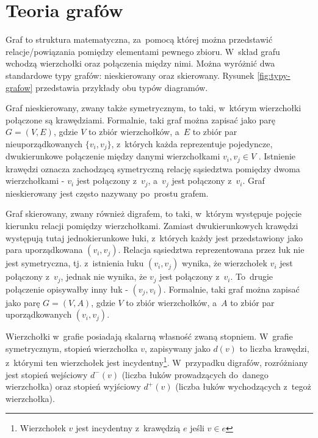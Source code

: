 \documentclass[11pt,a4paper,oneside]{report}
\begin{document}
\makeReportTitlePage{\ReportOneTitle}{\ReportOneNumber}

\tableofcontents
\clearpage

\section{Teoria grafów}

Graf to struktura matematyczna, za~pomocą której można przedstawić relacje/powiązania pomiędzy elementami pewnego zbioru. W~skład grafu wchodzą wierzchołki oraz połączenia między nimi. Można wyróżnić dwa standardowe typy grafów: nieskierowany oraz skierowany. Rysunek \ref{fig:typy-grafow} przedstawia przykłady obu typów diagramów.

Graf nieskierowany, zwany także symetrycznym, to taki, w~którym wierzchołki połączone są krawędziami. Formalnie, taki graf można zapisać jako parę $G = (V, E)$, gdzie $V$ to zbiór wierzchołków, a~$E$ to zbiór par nieuporządkowanych $\{v_i, v_j\}$, z~których każda reprezentuje pojedyncze, dwukierunkowe połączenie między danymi wierzchołkami $v_i, v_j \in V$ \cite{sikorski-nd-matematykadyskretna}. Istnienie krawędzi oznacza zachodzącą symetryczną relację sąsiedztwa pomiędzy dwoma wierzchołkami - $v_i$ jest połączony z~$v_j$, a~$v_j$ jest połączony z~$v_i$. Graf nieskierowany jest często nazywany po~prostu \glqq grafem\grqq{}.

Graf skierowany, zwany również digrafem, to taki, w~którym występuje pojęcie kierunku relacji pomiędzy wierzchołkami. Zamiast dwukierunkowych krawędzi występują tutaj jednokierunkowe łuki, z~których każdy jest przedstawiony jako para uporządkowana $(v_i, v_j)$. Relacja sąsiedztwa reprezentowana przez łuk nie jest symetryczna, tj. z~istnienia łuku $(v_i, v_j)$ wynika, że wierzchołek $v_i$ jest połączony z~$v_j$, jednak nie wynika, że $v_j$ jest połączony z~$v_i$. To~drugie połączenie opisywałby inny łuk - $(v_j, v_i)$. Formalnie, taki graf można zapisać jako parę $G = (V, A)$, gdzie $V$ to zbiór wierzchołków, a~$A$ to zbiór par uporządkowanych $(v_i, v_j)$.



Wierzchołki w~grafie posiadają skalarną własność zwaną \glqq stopniem\grqq{}. W~grafie symetrycznym, stopień wierzchołka $v$, zapisywany jako $d(v)$ to liczba krawędzi, z~którymi ten wierzchołek jest incydentny\footnote{Wierzchołek $v$ jest incydentny z~krawędzią $e$ jeśli $v \in e$}. W~przypadku digrafów, rozróżniany jest stopień wejściowy $d^{-}(v)$ (liczba łuków prowadzących do~danego wierzchołka) oraz stopień wyjściowy $d^{+}(v)$ (liczba łuków wychodzących z~tegoż wierzchołka).
\end{document}
